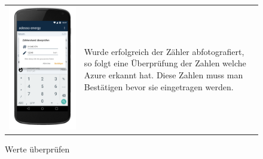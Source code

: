 \begin{figure}[h]
\begin{tabularx}{\textwidth}{X  X}
	\includegraphics[scale = 0.155]{img/AndroidMockup/check} \caption{Werte überprüfen} & Wurde erfolgreich der Zähler abfotografiert, so folgt eine Überprüfung der Zahlen welche Azure erkannt hat. Diese Zahlen muss man Bestätigen bevor sie eingetragen werden. \\ 
\end{tabularx}
\end{figure}

